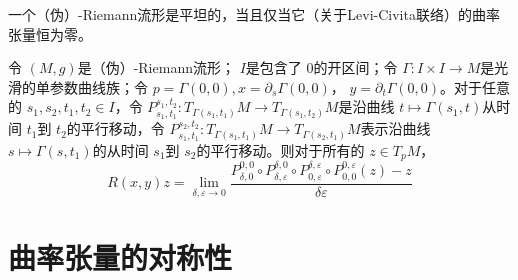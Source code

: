 \documentclass[../../几何与拓扑.tex]{subfiles}
\begin{document}
\begin{theorem}
    一个（伪）-Riemann流形是平坦的，当且仅当它（关于Levi-Civita联络）的曲率张量恒为零。
\end{theorem}

\begin{theorem}
    令 \(  \left( M,g \right)   \)是（伪）-Riemann流形； \(  I  \)是包含了 \(  0  \)的开区间；令 \(   \Gamma :I\times I\to M  \)是光滑的单参数曲线族；令 \(  p=  \Gamma \left( 0,0 \right),x =  \partial _{s} \Gamma \left( 0,0 \right)    \)， \(  y= \partial _{t} \Gamma \left( 0,0 \right)   \)。对于任意的 \(  s_1,s_2,t_1,t_2\in I  \)，令 \(  P_{s_1,t_1}^{s_1,t_2}: T_{ \Gamma \left( s_1,t_1 \right) }M\to T_{ \Gamma \left( s_1,t_2 \right) }M  \)是沿曲线 \(  t\mapsto  \Gamma \left( s_1,t \right)   \)从时间 \(  t_1  \)到 \(  t_2  \)的平行移动，令 \(  P_{s_1,t_1}^{s_2,t_2}:T_{ \Gamma \left( s_1,t_1 \right) }M\to T_{ \Gamma \left( s_2,t_1 \right) }M  \)表示沿曲线 \(  s\mapsto  \Gamma \left( s,t_1 \right)   \)的从时间 \(  s_1  \)到 \(  s_2  \)的平行移动。则对于所有的 \(  z \in T_{p}M  \)， \[
    R\left( x,y \right)z =  \lim_{ \delta  , \varepsilon  \to 0} \frac{P_{ \delta  ,0}^{0,0}\circ P_{ \delta  , \varepsilon }^{ \delta  ,0}\circ P_{0, \varepsilon }^{ \delta  , \varepsilon }\circ P_{0,0}^{0, \varepsilon }\left( z \right)-z  }{  \delta   \varepsilon }  
    \]                
\end{theorem}

\section{曲率张量的对称性}
\end{document}
